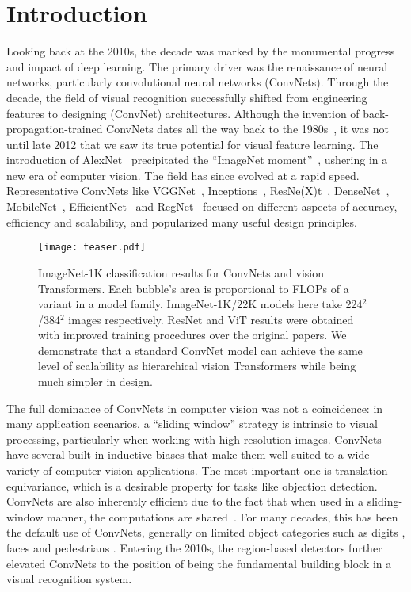 \section{Introduction}
\label{sec:intro}

Looking back at the 2010s, the decade was marked by the monumental progress and impact of deep learning. The primary driver was the renaissance of neural networks, particularly convolutional neural networks (ConvNets). Through the decade, the field of visual recognition successfully shifted from engineering features to designing (ConvNet) architectures. Although the invention of back-propagation-trained ConvNets dates all the way back to the 1980s~\cite{LeCun1989}, it was not until late 2012 that we saw its true potential for visual feature learning. The introduction of AlexNet~\cite{alexnet} precipitated the ``ImageNet moment''~\cite{Russakovsky2015}, ushering in a new era of computer vision. The field has since evolved at a rapid speed. Representative ConvNets like VGGNet~\cite{Simonyan2014}, Inceptions~\cite{Szegedy2015}, ResNe(X)t~\cite{resnet,Xie2017}, DenseNet~\cite{densenet}, MobileNet~\cite{Howard2017}, EfficientNet~\cite{Tan2019efficientnet} and RegNet~\cite{Radosavovic2020designing} focused on different aspects of accuracy, efficiency and scalability, and popularized many useful design principles. 

\begin{figure}[!htbp]
\centering
\texttt{[image: teaser.pdf]}
\caption{ImageNet-1K classification results for \cb ConvNets and \vb vision Transformers. Each bubble's area is proportional to FLOPs of a variant in a model family. ImageNet-1K/22K models here take 224$^2$/384$^2$ images respectively. ResNet and ViT results were obtained with improved training procedures over the original papers. We demonstrate that a standard ConvNet model can achieve the same level of scalability as hierarchical vision Transformers while being much simpler in design.}
\label{fig:teaser_convnext}
\end{figure}

The full dominance of ConvNets in computer vision was not a coincidence: in many application scenarios, a ``sliding window'' strategy is intrinsic to visual processing, particularly when working with high-resolution images. ConvNets have several built-in inductive biases that make them well-suited to a wide variety of computer vision applications. The most important one is translation equivariance, which is a desirable property for tasks like objection detection. ConvNets are also inherently efficient due to the fact that when used in a sliding-window manner, the computations are shared~\cite{Sermanet2014}. For many decades, this has been the default use of ConvNets, generally on limited object categories such as digits \cite{lecun1998gradient}, faces \cite{vaillant1994original,rowley1998neural} and pedestrians \cite{sermanet2013pedestrian, dollar2010fastest}. Entering the 2010s, the region-based detectors \cite{rcnn, Girshick2015, Ren2015, He2017} further elevated ConvNets to the position of being the fundamental building block in a visual recognition system. 

